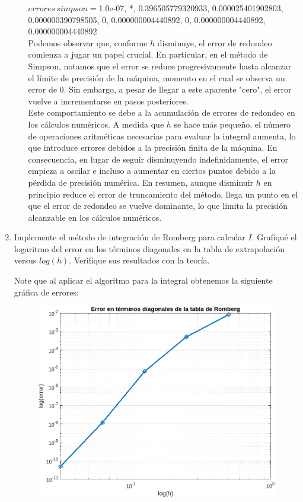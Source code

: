 \begin{homeworkProblem}
\begin{enumerate}
\begin{solucion}
\begin{itemize}
          $errores\, simpson =$1.0e-07, *, 0.396505779320933, 0.000025401902803, 0.000000390798505, 0, 0.000000004440892, 0, 0.000000004440892, 0.000000004440892\\
          Podemos observar que, conforme $h$ disminuye, el error de redondeo comienza a jugar un papel crucial. En particular, en el método de Simpson, notamos que el error se reduce progresivamente hasta alcanzar el límite de precisión de la máquina, momento en el cual se observa un error de  $0$. Sin embargo, a pesar de llegar a este aparente "cero", el error vuelve a incrementarse en pasos posteriores.\\
          Este comportamiento se debe a la acumulación de errores de redondeo en los cálculos numéricos. A medida que $h$ se hace más pequeño, el número de operaciones aritméticas necesarias para evaluar la integral aumenta, lo que introduce errores debidos a la precisión finita de la máquina. En consecuencia, en lugar de seguir disminuyendo indefinidamente, el error empieza a oscilar e incluso a aumentar en ciertos puntos debido a la pérdida de precisión numérica.
          En resumen, aunque disminuir $h$ en principio reduce el error de truncamiento del método, llega un punto en el que el error de redondeo se vuelve dominante, lo que limita la precisión alcanzable en los cálculos numéricos.
        \end{itemize}
      \end{solucion}
    \item Implemente el método de integración de Romberg para calcular $I$. Grafiqué el logaritmo del error en los términos diagonales en la tabla de extrapolación versus $log(h)$. Verifique sus resultados con la teoría.
      \begin{solucion}
        Note que al aplicar el algoritmo para la integral obtenemos la siguiente gráfica de errores:
        \begin{figure}[H]
        \begin{center}
          \includegraphics[scale=0.7]{Figures/Romberg.png}

\end{center}
\end{figure}
\end{solucion}
\end{enumerate}
\end{homeworkProblem}
